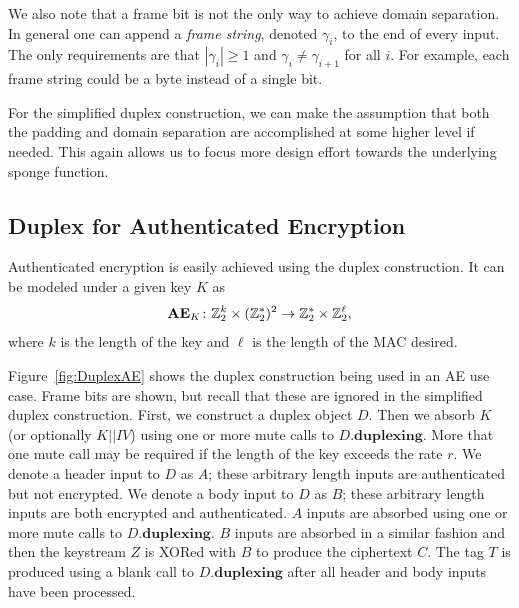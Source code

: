 We also note that a frame bit is not the only way to achieve domain separation.
In general one can append a \emph{frame string}, denoted $\gamma_i$, to the end of every input.
The only requirements are that $|\gamma_i| \ge 1$ and $\gamma_i \ne \gamma_{i+1}$ for all $i$. 
For example, each frame string could be a byte instead of a single bit.

For the simplified duplex construction, we can make the assumption that both the padding and domain separation are accomplished at some higher level if needed.
This again allows us to focus more design effort towards the underlying sponge function.

\subsection{Duplex for Authenticated Encryption}
Authenticated encryption is easily achieved using the duplex construction.
It can be modeled under a given key $K$ as
\begin{equation*}
\mathbf{AE}_K \colon \mathbb{Z}_2^k \times (\mathbb{Z}_2^*)^2 \rightarrow \mathbb{Z}_2^* \times \mathbb{Z}_2^{\ell},
\end{equation*}
where $k$ is the length of the key and $\ell$ is the length of the MAC desired.

Figure~\ref{fig:DuplexAE} shows the duplex construction being used in an AE use case.
Frame bits are shown, but recall that these are ignored in the simplified duplex construction.
First, we construct a duplex object $D$.
Then we absorb $K$ (or optionally $K||IV$) using one or more mute calls to $D.\mathbf{duplexing}$.
More that one mute call may be required if the length of the key exceeds the rate $r$.
We denote a header input to $D$ as $A$; these arbitrary length inputs are authenticated but not encrypted.
We denote a body input to $D$ as $B$; these arbitrary length inputs are both encrypted and authenticated.
$A$ inputs are absorbed using one or more mute calls to $D.\mathbf{duplexing}$.
$B$ inputs are absorbed in a similar fashion and then the keystream $Z$ is XORed with $B$ to produce the ciphertext $C$.
The tag $T$ is produced using a blank call to $D.\mathbf{duplexing}$ after all header and body inputs have been processed.

